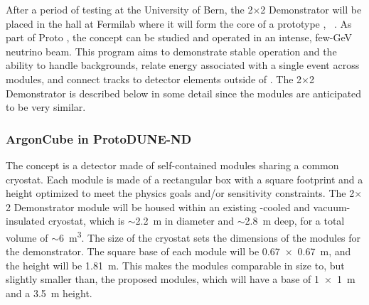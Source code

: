 After a period of testing at the University of Bern, the  2$\times$2 Demonstrator will be placed in the    hall at Fermilab where it will form the core of a prototype   , ~\cite{bib:docdb12571}.   As part of Proto , the  concept can be studied and operated in an intense, few-GeV neutrino beam.  This program aims to demonstrate stable operation and the ability to handle backgrounds, relate energy associated with a single event across  modules, and connect tracks to detector elements outside of .  The  2$\times$2 Demonstrator is described below in some detail since the    modules are anticipated to be very similar.


\subsubsection{ArgonCube in ProtoDUNE-ND}
\label{sec:2x2-design}


The   concept is a detector made of self-contained  modules sharing a common cryostat. Each module is made of a rectangular box with a square footprint and a height optimized to meet the physics goals and/or sensitivity constraints. The  2$\times$2 Demonstrator module will be housed within an existing \lntwo-cooled and vacuum-insulated cryostat, 
which is $\sim$\SI{2.2}{\metre} in diameter and $\sim$\SI{2.8}{\metre} deep, for a total volume of $\sim$\SI{6}{\metre\cubed}. The size of the cryostat sets the dimensions of the modules for the demonstrator. The square base of each module will be \SI{0.67 x 0.67}{\metre}, and the height will be \SI{1.81}{\metre}. This makes the modules comparable in size to, but slightly smaller than, the proposed     modules, which will have a base of \SI{1 x 1}{\metre} and a \SI{3.5}{\metre} height.

